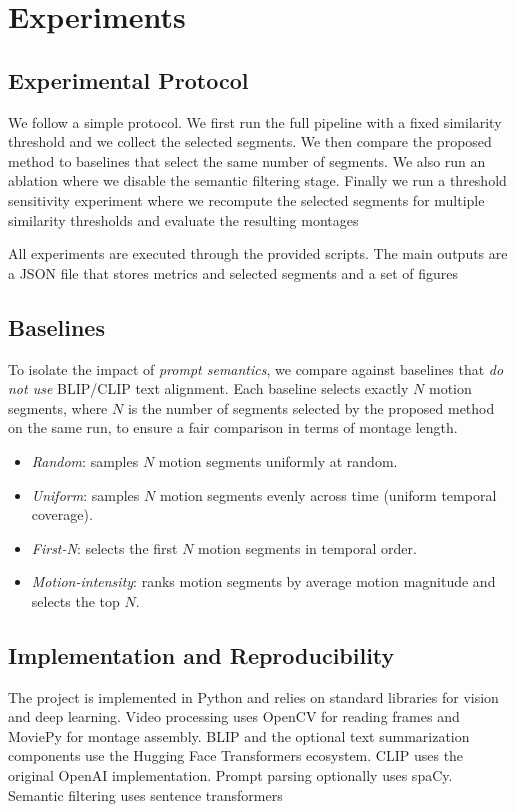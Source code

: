 \documentclass[conference,compsoc]{IEEEtran}
\begin{document}
\section{Experiments}

\subsection{Experimental Protocol}
We follow a simple protocol. We first run the full pipeline with a fixed similarity threshold and we collect the selected segments. We then compare the proposed method to baselines that select the same number of segments. We also run an ablation where we disable the semantic filtering stage. Finally we run a threshold sensitivity experiment where we recompute the selected segments for multiple similarity thresholds and evaluate the resulting montages

All experiments are executed through the provided scripts. The main outputs are a JSON file that stores metrics and selected segments and a set of figures

\subsection{Baselines}
To isolate the impact of \emph{prompt semantics}, we compare against baselines that \emph{do not use} BLIP/CLIP text alignment. Each baseline selects exactly \(N\) motion segments, where \(N\) is the number of segments selected by the proposed method on the same run, to ensure a fair comparison in terms of montage length.
\begin{itemize}
\item \emph{Random}: samples \(N\) motion segments uniformly at random.
\item \emph{Uniform}: samples \(N\) motion segments evenly across time (uniform temporal coverage).
\item \emph{First-N}: selects the first \(N\) motion segments in temporal order.
\item \emph{Motion-intensity}: ranks motion segments by average motion magnitude and selects the top \(N\).
\end{itemize}

\subsection{Implementation and Reproducibility}
The project is implemented in Python and relies on standard libraries for vision and deep learning. Video processing uses OpenCV for reading frames and MoviePy for montage assembly. BLIP and the optional text summarization components use the Hugging Face Transformers ecosystem. CLIP uses the original OpenAI implementation. Prompt parsing optionally uses spaCy. Semantic filtering uses sentence transformers
\end{document}
